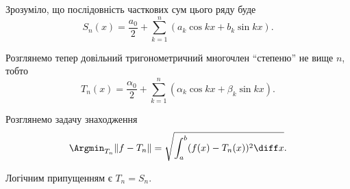 Зрозуміло, що послідовність часткових сум цього ряду буде
\begin{equation}
    S_n(x) = \frac{a_0}{2} + \sum_{k = 1}^n (a_k \cos k x + b_k \sin k x).
\end{equation}

Розглянемо тепер довільний тригонометричний многочлен ``степеню'' не вище $n$, тобто
\begin{equation}
    T_n(x) = \frac{\alpha_0}{2} + \sum_{k = 1}^n (\alpha_k \cos k x + \beta_k \sin k x).
\end{equation}

Розглянемо задачу знаходження
\begin{equation}
    \Argmin_{T_n} \|f - T_n\| = \sqrt{\int_a^b (f(x) - T_n(x))^2 \diff x}.  
\end{equation}

Логічним припущенням є $T_n = S_n$.

